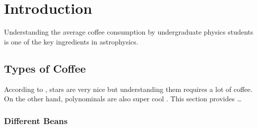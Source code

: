 
\chapter{Introduction}
\label{chap:intro}

Understanding the average coffee consumption by undergraduate physics students
is one of the key ingredients in astrophysics.

\section{Types of Coffee}
\label{sec:intro_coffee}

According to \textcite{kww}, stars are very nice but understanding them requires
a lot of coffee. On the other hand, polynominals are also super cool \parencite{cortes}. This section provides \ldots


\subsection{Different Beans}
\label{sec:intro_coffee_beans}

\lipsum
